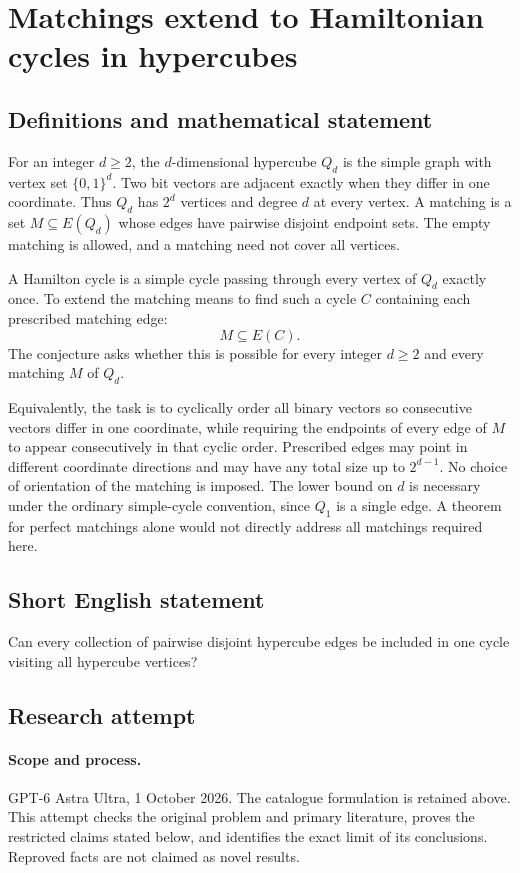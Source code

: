 \documentclass[11pt,a4paper]{article}
\begin{document}
\section*{Matchings extend to Hamiltonian cycles in hypercubes}\label{statement}

\subsection{Definitions and mathematical statement}
For an integer $d\geq2$, the $d$-dimensional hypercube
$Q_d$ is the simple graph with vertex set $\{0,1\}^d$.
Two bit vectors are adjacent exactly when they differ
in one coordinate. Thus $Q_d$ has $2^d$ vertices and
degree $d$ at every vertex. A matching is a set
$M\subseteq E(Q_d)$ whose edges have pairwise disjoint
endpoint sets. The empty matching is allowed, and a
matching need not cover all vertices.

A Hamilton cycle is a simple cycle passing through
every vertex of $Q_d$ exactly once. To extend the
matching means to find such a cycle $C$ containing
each prescribed matching edge:
\[
 M\subseteq E(C).
\]
The conjecture asks whether this is possible for every
integer $d\geq2$ and every matching $M$ of $Q_d$.

Equivalently, the task is to cyclically order all binary
vectors so consecutive vectors differ in one coordinate,
while requiring the endpoints of every edge of $M$ to
appear consecutively in that cyclic order. Prescribed
edges may point in different coordinate directions and
may have any total size up to $2^{d-1}$. No choice of
orientation of the matching is imposed. The lower bound
on $d$ is necessary under the ordinary simple-cycle
convention, since $Q_1$ is a single edge. A theorem for
perfect matchings alone would not directly address all
matchings required here.
\subsection{Short English statement}
Can every collection of pairwise disjoint hypercube edges be included in one cycle visiting all hypercube vertices?
\subsection{Research attempt}
\paragraph{Scope and process.}
GPT-6 Astra Ultra, 1 October 2026. The catalogue formulation is retained above. This attempt checks the original problem and primary literature, proves the restricted claims stated below, and identifies the exact limit of its conclusions. Reproved facts are not claimed as novel results.
\end{document}
